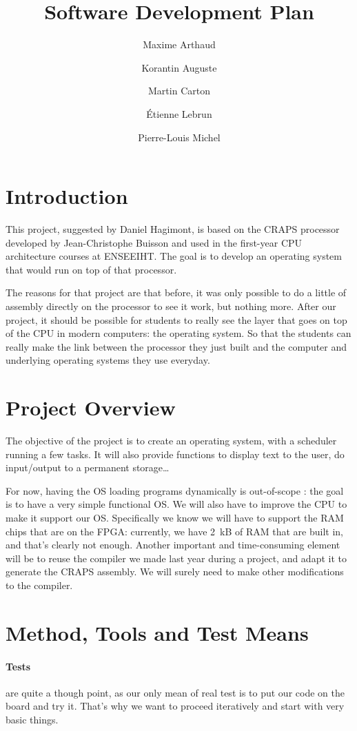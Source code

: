 \documentclass{article}
\title{Software Development Plan}
\author{
       Maxime Arthaud
  \and Korantin Auguste
  \and Martin Carton
  \and Étienne Lebrun
  \and Pierre-Louis Michel
}
\begin{document}
  \maketitle
  \tableofcontents
  \newpage

  \section{Introduction}
    This project, suggested by Daniel Hagimont, is based on the CRAPS processor
    developed by Jean-Christophe Buisson and used in the first-year CPU
    architecture courses at ENSEEIHT. The goal is to develop an operating
    system that would run on top of that processor.

    The reasons for that project are that before, it was only possible to do a
    little of assembly directly on the processor to see it work, but nothing
    more.  After our project, it should be possible for students to really see
    the layer that goes on top of the CPU in modern computers: the operating
    system. So that the students can really make the link between the processor
    they just built and the computer and underlying operating systems they use
    everyday.


  \section{Project Overview}
    The objective of the project is to create an operating system, with a
    scheduler running a few tasks. It will also provide functions to display
    text to the user, do input/output to a permanent storage\dots

    For now, having the OS loading programs dynamically is out-of-scope : the
    goal is to have a very simple functional OS.  We will also have to improve
    the CPU to make it support our OS. Specifically we know we will have to
    support the RAM chips that are on the FPGA: currently, we have \SI{2}{kB}
    of RAM that are built in, and that's clearly not enough. Another important
    and time-consuming element will be to reuse the compiler we made last year
    during a project, and adapt it to generate the CRAPS assembly. We will
    surely need to make other modifications to the compiler.

  \section{Method, Tools and Test Means}
    \paragraph{Tests} are quite a though point, as our only mean of real test is
    to put our code on the board and try it. That's why we want to proceed
    iteratively and start with very basic things.
\end{document}

